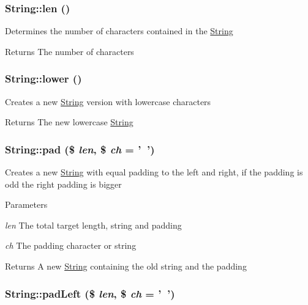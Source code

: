 \hypertarget{classString_afa58fa9927bc0240baf185917c849245}{
\subsubsection[{len}]{\setlength{\rightskip}{0pt plus 5cm}String::len ()}}
\label{classString_afa58fa9927bc0240baf185917c849245}
Determines the number of characters contained in the \hyperlink{classString}{String} \begin{DoxyReturn}{Returns}
The number of characters 
\end{DoxyReturn}
\hypertarget{classString_a70de74664e69b6e2fc93d231173df0d2}{
\subsubsection[{lower}]{\setlength{\rightskip}{0pt plus 5cm}String::lower ()}}
\label{classString_a70de74664e69b6e2fc93d231173df0d2}
Creates a new \hyperlink{classString}{String} version with lowercase characters \begin{DoxyReturn}{Returns}
The new lowercase \hyperlink{classString}{String} 
\end{DoxyReturn}
\hypertarget{classString_aa8542443a25479d810d0c580680f685d}{
\subsubsection[{pad}]{\setlength{\rightskip}{0pt plus 5cm}String::pad (\$ {\em len}, \/  \$ {\em ch} = {\ttfamily '~'})}}
\label{classString_aa8542443a25479d810d0c580680f685d}
Creates a new \hyperlink{classString}{String} with equal padding to the left and right, if the padding is odd the right padding is bigger 
\begin{DoxyParams}{Parameters}
\item[{\em len}]The total target length, string and padding \item[{\em ch}]The padding character or string \end{DoxyParams}
\begin{DoxyReturn}{Returns}
A new \hyperlink{classString}{String} containing the old string and the padding 
\end{DoxyReturn}
\hypertarget{classString_ae39386e13e0e87cff555bfaea20ce656}{
\subsubsection[{padLeft}]{\setlength{\rightskip}{0pt plus 5cm}String::padLeft (\$ {\em len}, \/  \$ {\em ch} = {\ttfamily '~'})}}
